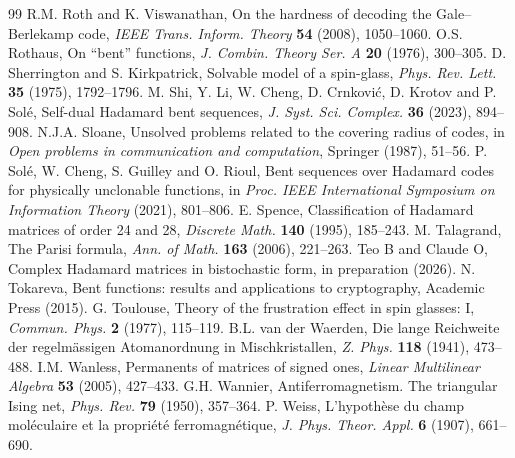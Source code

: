 \documentclass[11pt,a4paper]{article}
\theoremstyle{remark}
\begin{document}
\begin{thebibliography}{99}
R.M. Roth and K. Viswanathan, On the hardness of decoding the Gale--Berlekamp code, \emph{IEEE Trans. Inform. Theory} \textbf{54} (2008), 1050--1060.
O.S. Rothaus, On ``bent'' functions, \emph{J. Combin. Theory Ser. A} \textbf{20} (1976), 300--305.
D. Sherrington and S. Kirkpatrick, Solvable model of a spin-glass, \emph{Phys. Rev. Lett.} \textbf{35} (1975), 1792--1796.
M. Shi, Y. Li, W. Cheng, D. Crnkovi\'c, D. Krotov and P. Sol\'e, Self-dual Hadamard bent sequences, \emph{J. Syst. Sci. Complex.} \textbf{36} (2023), 894--908.
N.J.A. Sloane, Unsolved problems related to the covering radius of codes, in \emph{Open problems in communication and computation}, Springer (1987), 51--56.
P. Sol\'e, W. Cheng, S. Guilley and O. Rioul, Bent sequences over Hadamard codes for physically unclonable functions, in \emph{Proc. IEEE International Symposium on Information Theory} (2021), 801--806.
E. Spence, Classification of Hadamard matrices of order 24 and 28, \emph{Discrete Math.} \textbf{140} (1995), 185--243.
M. Talagrand, The Parisi formula, \emph{Ann. of Math.} \textbf{163} (2006), 221--263.
Teo B and Claude O, Complex Hadamard matrices in bistochastic form, in preparation (2026).
N. Tokareva, Bent functions: results and applications to cryptography, Academic Press (2015).
G. Toulouse, Theory of the frustration effect in spin glasses: I, \emph{Commun. Phys.} \textbf{2} (1977), 115--119.
B.L. van der Waerden, Die lange Reichweite der regelm\"assigen Atomanordnung in Mischkristallen, \emph{Z. Phys.} \textbf{118} (1941), 473--488.
I.M. Wanless, Permanents of matrices of signed ones, \emph{Linear Multilinear Algebra} \textbf{53} (2005), 427--433.
G.H. Wannier, Antiferromagnetism. The triangular Ising net, \emph{Phys. Rev.} \textbf{79} (1950), 357--364.
P. Weiss, L'hypoth\`ese du champ mol\'eculaire et la propri\'et\'e ferromagn\'etique, \emph{J. Phys. Theor. Appl.} \textbf{6} (1907), 661--690.
\end{thebibliography}
\end{document}
